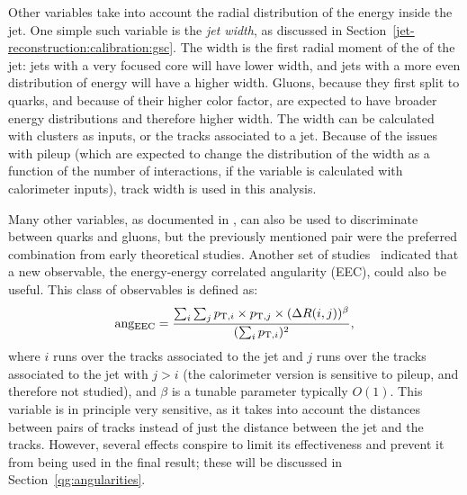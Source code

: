 Other variables take into account the radial distribution of the energy inside the jet. One simple such variable is the \textit{jet width}, as discussed in Section~\ref{jet-reconstruction:calibration:gsc}. The width is the first radial moment of the \pt of the jet: jets with a very focused core will have lower width, and jets with a more even distribution of energy will have a higher width. Gluons, because they first split to quarks, and because of their higher color factor, are expected to have broader energy distributions and therefore higher width. The width can be calculated with clusters as inputs, or the tracks associated to a jet. Because of the issues with pileup (which are expected to change the distribution of the width as a function of the number of interactions, if the variable is calculated with calorimeter inputs), track width is used in this analysis.

Many other variables, as documented in \cite{schwartz1}, can also be used to discriminate between quarks and gluons, but the previously mentioned pair were the preferred combination from early theoretical studies. Another set of studies~\cite{EEC} indicated that a new observable, the energy-energy correlated angularity (EEC), could also be useful. This class of observables is defined as:
\begin{equation}
{\rm ang_{\rm EEC}}=\frac{ \sum_i \sum_j p_{{\rm T},i} \times p_{{\rm T},j} \times (\Delta R(i,j))^\beta}{ (\sum_i p_{{\rm T},i})^2 },
\end{equation}
where $i$ runs over the tracks associated to the jet and $j$ runs over the tracks associated to the jet with $j>i$ (the calorimeter version is sensitive to pileup, and therefore not studied), and $\beta$ is a tunable parameter typically $O(1)$. This variable is in principle very sensitive, as it takes into account the distances between pairs of tracks instead of just the distance between the jet and the tracks. However, several effects conspire to limit its effectiveness and prevent it from being used in the final result; these will be discussed in Section~\ref{qg:angularities}.


